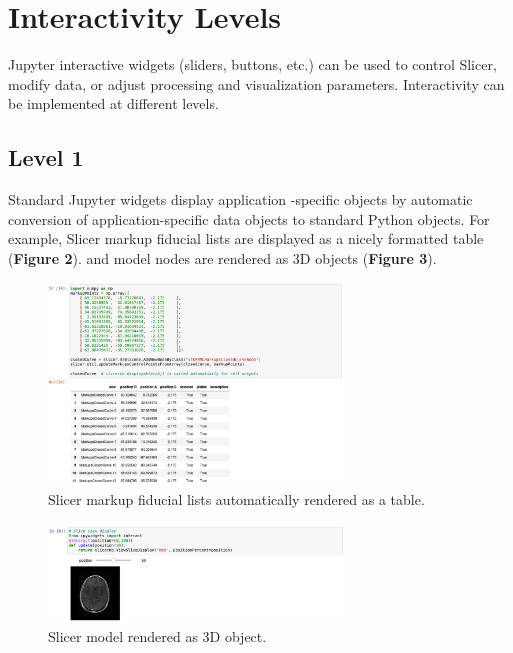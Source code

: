 \documentclass{IEEEcsmag}
\begin{document}
\section{Interactivity Levels}

Jupyter interactive widgets (sliders, buttons, etc.) can be used to control Slicer, modify data, or adjust processing and visualization parameters. Interactivity can be implemented at different levels.

\subsection{Level 1}

Standard Jupyter widgets display application -specific objects by automatic conversion of application-specific data objects to standard Python objects. For example, Slicer markup fiducial lists are displayed as a nicely formatted table ({\bf Figure 2}). and model nodes are rendered as 3D objects ({\bf Figure 3}).

\begin{figure}
\centerline{\includegraphics[width=18.5pc]{figure2_markups.png}}
\caption{Slicer markup fiducial lists  automatically rendered as a table.}
\end{figure}

\begin{figure}
\centerline{\includegraphics[width=18.5pc]{figure3_model.png}}
\caption{Slicer model rendered as 3D object.}
\end{figure}
\end{document}
